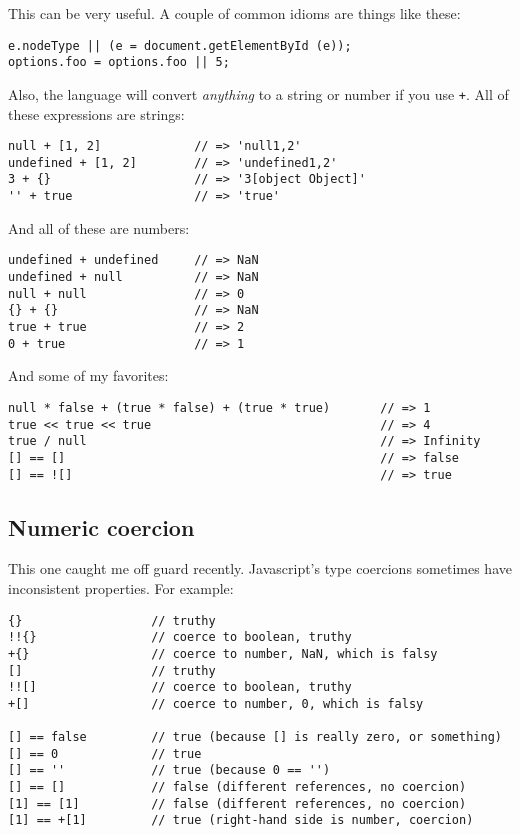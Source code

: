 \documentclass{article}
\begin{document}
    This can be very useful. A couple of common idioms are things like these:

\begin{verbatim}
e.nodeType || (e = document.getElementById (e));
options.foo = options.foo || 5;
\end{verbatim}

    Also, the language will convert {\it anything} to a string or number if you use \verb|+|. All of these expressions are strings:

\begin{verbatim}
null + [1, 2]             // => 'null1,2'
undefined + [1, 2]        // => 'undefined1,2'
3 + {}                    // => '3[object Object]'
'' + true                 // => 'true'
\end{verbatim}

    And all of these are numbers:

\begin{verbatim}
undefined + undefined     // => NaN
undefined + null          // => NaN
null + null               // => 0
{} + {}                   // => NaN
true + true               // => 2
0 + true                  // => 1
\end{verbatim}

    And some of my favorites:

\begin{verbatim}
null * false + (true * false) + (true * true)       // => 1
true << true << true                                // => 4
true / null                                         // => Infinity
[] == []                                            // => false
[] == ![]                                           // => true
\end{verbatim}

\subsection {Numeric coercion}
    \label{sec:numeric-coercion}
    This one caught me off guard recently. Javascript's type coercions sometimes have inconsistent properties. For example:

\begin{verbatim}
{}                  // truthy
!!{}                // coerce to boolean, truthy
+{}                 // coerce to number, NaN, which is falsy
[]                  // truthy
!![]                // coerce to boolean, truthy
+[]                 // coerce to number, 0, which is falsy

[] == false         // true (because [] is really zero, or something)
[] == 0             // true
[] == ''            // true (because 0 == '')
[] == []            // false (different references, no coercion)
[1] == [1]          // false (different references, no coercion)
[1] == +[1]         // true (right-hand side is number, coercion)
\end{verbatim}
\end{document}
